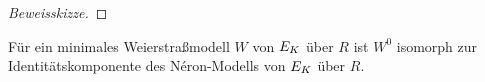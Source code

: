 \begin{Lemma}
\begin{proof}[Beweisskizze]
  \end{proof}
\end{Lemma}

\begin{Bemerkung}
  Für ein minimales Weierstraßmodell $W$ von $E_{K}$ über $R$
  ist $W^0$ isomorph zur Identitätskomponente des Néron-Modells von
  $E_{K}$ über $R$.
\end{Bemerkung}


